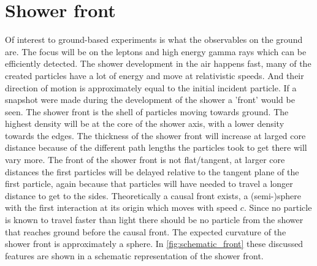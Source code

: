 \section{Shower front}


Of interest to ground-based experiments is what the observables on the ground are. The focus will be on the leptons and high energy gamma rays which can be efficiently detected. The shower development in the air happens fast, many of the created particles have a lot of energy and move at relativistic speeds. And their direction of motion is approximately equal to the initial incident particle. If a snapshot were made during the development of the shower a 'front' would be seen. The shower front is the shell of particles moving towards ground. The highest density will be at the core of the shower axis, with a lower density towards the edges. The thickness of the shower front will increase at larged core distance because of the different path lengths the particles took to get there will vary more. The front of the shower front is not flat/tangent, at larger core distances the first particles will be delayed relative to the tangent plane of the first particle, again because that particles will have needed to travel a longer distance to get to the sides. Theoretically a causal front exists, a (semi-)sphere with the first interaction at its origin which moves with speed $c$. Since no particle is known to travel faster than light there should be no particle from the shower that reaches ground before the causal front. The expected curvature of the shower front is approximately a sphere. In \cref{fig:schematic_front} these discussed features are shown in a schematic representation of the shower front.

